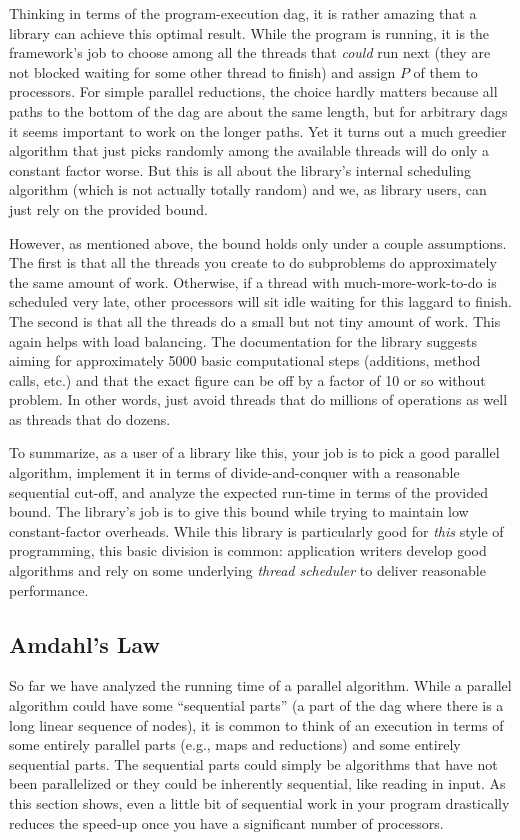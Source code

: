 \documentclass[10pt]{article}
\begin{document}
Thinking in terms of the program-execution dag, it is rather amazing
that a library can achieve this optimal result.  While the program is
running, it is the framework's job to choose among all the threads
that \emph{could} run next (they are not blocked waiting for some
other thread to finish) and assign $P$ of them to processors.  For
simple parallel reductions, the choice hardly matters because all
paths to the bottom of the dag are about the same length, but for
arbitrary dags it seems important to work on the longer paths.  Yet it
turns out a much greedier algorithm that just picks randomly among the
available threads will do only a constant factor worse.  But this is
all about the library's internal scheduling algorithm (which is not
actually totally random) and we, as library users, can just rely on
the provided bound.

However, as mentioned above, the bound holds only under a couple
assumptions.  The first is that all the threads you create to do
subproblems do approximately the same amount of work.  Otherwise, if a
thread with much-more-work-to-do is scheduled very late, other
processors will sit idle waiting for this laggard to finish.  The
second is that all the threads do a small but not tiny amount of work.
This again helps with load balancing.  The documentation for the
library suggests aiming for approximately 5000 basic computational
steps (additions, method calls, etc.) and that the exact figure can be
off by a factor of 10 or so without problem.  In other words, just avoid
threads that do millions of operations as well as threads that do
dozens.

To summarize, as a user of a library like this, your job is to pick a
good parallel algorithm, implement it in terms of divide-and-conquer
with a reasonable sequential cut-off, and analyze the expected
run-time in terms of the provided bound.  The library's job is to give
this bound while trying to maintain low constant-factor overheads.
While this library is particularly good for \emph{this} style of
programming, this basic division is common: application writers
develop good algorithms and rely on some underlying \emph{thread
  scheduler} to deliver reasonable performance.

\subsection{Amdahl's Law}

So far we have analyzed the running time of a parallel algorithm.
While a parallel algorithm could have some ``sequential parts''
(a part of the dag where there is a long linear sequence of nodes), it
is common to think of an execution in terms of some entirely parallel
parts (e.g., maps and reductions) and some entirely sequential parts.
The sequential parts could simply be algorithms that have not been
parallelized or they could be inherently sequential, like reading in
input.  As this section shows, even a little bit of sequential work in
your program drastically reduces the speed-up once you have a
significant number of processors.  
\end{document}
